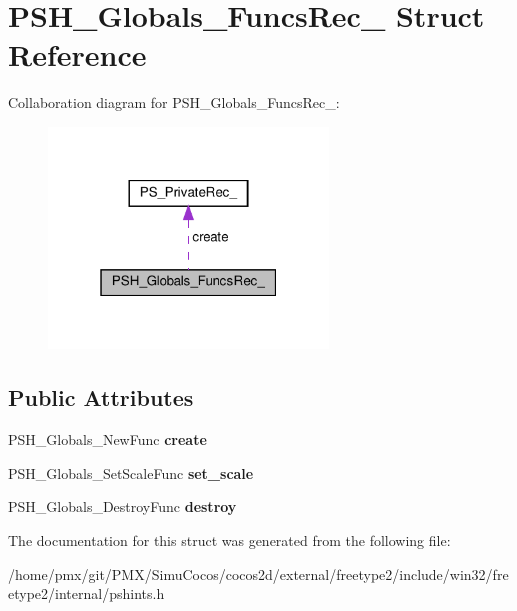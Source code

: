 \hypertarget{structPSH__Globals__FuncsRec__}{}\section{P\+S\+H\+\_\+\+Globals\+\_\+\+Funcs\+Rec\+\_\+ Struct Reference}
\label{structPSH__Globals__FuncsRec__}


Collaboration diagram for P\+S\+H\+\_\+\+Globals\+\_\+\+Funcs\+Rec\+\_\+\+:
\nopagebreak
\begin{figure}[H]
\begin{center}
\leavevmode
\includegraphics[width=211pt]{structPSH__Globals__FuncsRec____coll__graph}
\end{center}
\end{figure}
\subsection*{Public Attributes}
\begin{DoxyCompactItemize}
\item 
\mbox{\label{structPSH__Globals__FuncsRec___ac136cec55ea33a2e3b60ffdad20f5420}} 
P\+S\+H\+\_\+\+Globals\+\_\+\+New\+Func {\bfseries create}
\item 
\mbox{\label{structPSH__Globals__FuncsRec___a9c97456d3f521cb1091f08c2bda27332}} 
P\+S\+H\+\_\+\+Globals\+\_\+\+Set\+Scale\+Func {\bfseries set\+\_\+scale}
\item 
\mbox{\label{structPSH__Globals__FuncsRec___aebb5534f8305a189b09adfebff4f57ba}} 
P\+S\+H\+\_\+\+Globals\+\_\+\+Destroy\+Func {\bfseries destroy}
\end{DoxyCompactItemize}


The documentation for this struct was generated from the following file\+:\begin{DoxyCompactItemize}
\item 
/home/pmx/git/\+P\+M\+X/\+Simu\+Cocos/cocos2d/external/freetype2/include/win32/freetype2/internal/pshints.\+h\end{DoxyCompactItemize}

